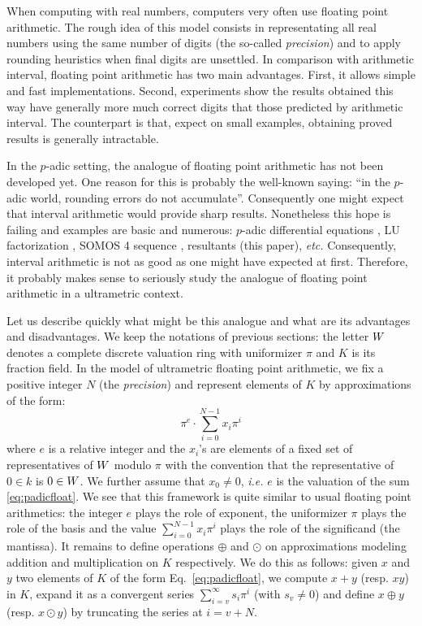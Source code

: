 \documentclass{sig-alternate}
\begin{document}
When computing with real numbers, computers very often use floating 
point arithmetic. 
The rough idea of this model consists in representating all real numbers 
using the same number of digits (the so-called \emph{precision}) and to
apply rounding heuristics when final digits are unsettled.
In comparison with arithmetic interval, floating point arithmetic has
two main advantages. First, it allows simple and fast implementations.
Second, experiments show the results obtained this way have generally
more much correct digits that those predicted by arithmetic interval.
The counterpart is that, expect on small examples, obtaining proved
results is generally intractable.

In the $p$-adic setting, the analogue of floating point arithmetic has 
not been developed yet. One reason for this is probably the well-known 
saying: ``in the $p$-adic world, rounding errors do not accumulate''. 
Consequently one might expect that interval arithmetic would provide 
sharp results. Nonetheless this hope is failing and examples are basic 
and numerous: $p$-adic differential equations \cite{bostan, padicdiff}, 
LU factorization \cite{LU}, SOMOS 4 sequence \cite{padicprec}, 
resultants (this paper), \emph{etc.} Consequently, interval arithmetic 
is not as good as one might have expected at first. Therefore, it 
probably makes sense to seriously study the analogue of floating point 
arithmetic in a ultrametric context.

Let us describe quickly what might be this analogue and what are its
advantages and disadvantages. We keep the notations of previous
sections: the letter $W$ denotes a complete discrete valuation ring
with uniformizer $\pi$ and $K$ is its fraction field.
In the model of ultrametric floating point arithmetic, we fix a
positive integer $N$ (the \emph{precision}) and represent elements 
of $K$ by approximations of the form:
\begin{equation}
\label{eq:padicfloat}
\pi^e \cdot \sum_{i=0}^{N-1} x_i \pi^i
\end{equation}
where $e$ is a relative integer and the $x_i$'s are elements of a fixed 
set of representatives of $W$ modulo $\pi$ with the convention that the 
representative of $0 \in k$ is $0 \in W$.
We further assume that $x_0 \neq 0$, \emph{i.e.} $e$ is the valuation
of the sum \eqref{eq:padicfloat}. We see that this framework is quite
similar to usual floating point arithmetics: the integer $e$ plays the
role of exponent, the uniformizer $\pi$ plays the role of the basis
and the value $\sum_{i=0}^{N-1} x_i \pi^i$ plays the role of the
significand (the mantissa). It remains to define operations $\oplus$
and $\odot$ on approximations modeling addition and multiplication
on $K$ respectively. We do this as follows: given $x$ and $y$ two
elements of $K$ of the form Eq.~\eqref{eq:padicfloat}, we compute
$x+y$ (resp. $xy$) in $K$, expand it as a convergent series 
$\sum_{i=v}^{\infty} s_i \pi^i$ (with $s_v \neq 0$) and define $x 
\oplus y$ (resp. $x \odot y$) by truncating the series at $i = v+N$.
\end{document}
